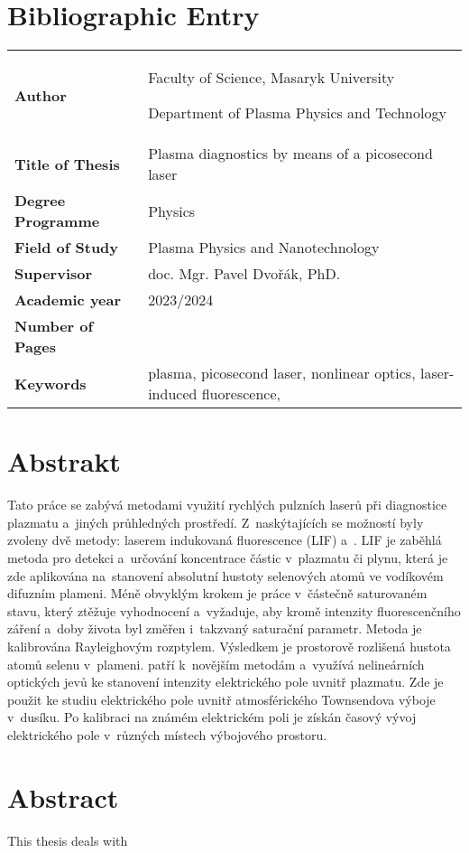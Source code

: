 \chapter*{Bibliographic Entry}
\thispagestyle{empty}
\bgroup
\renewcommand{\arraystretch}{\bibentryspacing}
\begin{tabularx}{\textwidth}{l X}
	\textbf{Author}           & \theauthor\par
	                            Faculty of Science, Masaryk University\par
	                            Department of Plasma Physics and Technology \\
	\textbf{Title of Thesis}  & Plasma diagnostics by means of a picosecond laser \\
	\textbf{Degree Programme} & Physics \\
	\textbf{Field of Study}   & Plasma Physics and Nanotechnology \\
	\textbf{Supervisor}       & doc. Mgr. Pavel Dvořák, PhD. \\
	\textbf{Academic year}    & 2023/2024 \\
	\textbf{Number of Pages}  & \pageref*{lastpage} \\
	\textbf{Keywords}         & plasma, picosecond laser,
	                            nonlinear optics,
	                            laser-induced fluorescence,
	                            \EFISH{} \\
\end{tabularx}
\egroup

\chapter*{Abstrakt}
Tato práce se zabývá metodami využití rychlých pulzních laserů
při diagnostice plazmatu a~jiných průhledných prostředí.
Z~naskýtajících se možností byly zvoleny dvě metody:
laserem indukovaná fluorescence (LIF) a~\EFISH.
LIF je zaběhlá metoda pro detekci a~určování koncentrace částic
v~plazmatu či plynu, která je zde aplikována na~stanovení absolutní
hustoty selenových atomů ve vodíkovém difuzním plameni.
Méně obvyklým krokem je práce v~částečně saturovaném stavu,
který ztěžuje vyhodnocení a~vyžaduje, aby kromě intenzity fluorescenčního
záření a~doby života byl změřen i~takzvaný saturační parametr.
Metoda je kalibrována Rayleighovým rozptylem.
Výsledkem je prostorově rozlišená hustota atomů selenu v~plameni.
\EFISH{} patří k~novějším metodám a~využívá nelineárních optických jevů
ke stanovení intenzity elektrického pole uvnitř plazmatu.
Zde je použit ke studiu elektrického pole uvnitř atmosférického
Townsendova výboje v~dusíku.
Po kalibraci na známém elektrickém poli je získán časový vývoj
elektrického pole v~různých místech výbojového prostoru.
\vfill
{\let\clearpage\relax\chapter*{Abstract}}
\thispagestyle{empty}
This thesis deals with %

